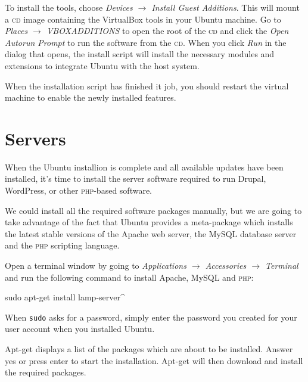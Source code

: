 \documentclass[draft,ebook,10pt,twoside,openright]{memoir}
\begin{document}
To install the tools, choose \emph{Devices $\rightarrow$ Install Guest Additions}. This will mount a \textsc{cd} image containing the VirtualBox tools in your Ubuntu machine. Go to \emph{Places $\rightarrow$ VBOXADDITIONS} to open the root of the \textsc{cd} and click the \emph{Open Autorun Prompt} to run the software from the \textsc{cd}. When you click \emph{Run} in the dialog that opens, the install script will install the necessary modules and extensions to integrate Ubuntu with the host system.

When the installation script has finished it job, you should restart the virtual machine to enable the newly installed features.


\chapter{Servers} \label{chservers}

\noindent
When the Ubuntu installion is complete and all available updates have been installed, it’s time to install the server software required to run Drupal, WordPress, or other \textsc{php}-based software.

We could install all the required software packages manually, but we are going to take advantage of the fact that Ubuntu provides a meta-package which installs the latest stable versions of the Apache web server, the MySQL database server and the \textsc{php} scripting language.

Open a terminal window by going to \emph{Applications $\rightarrow$ Accessories $\rightarrow$ Terminal} and run the following command to install Apache, MySQL and \textsc{php}:

\begin{squashboxcommand}
sudo apt-get install lamp-server^
\end{squashboxcommand}

When \verb!sudo! asks for a password, simply enter the password you created for your user account when you installed Ubuntu.

Apt-get displays a list of the packages which are about to be installed. Answer yes or press enter to start the installation. Apt-get will then download and install the required packages.
\end{document}
